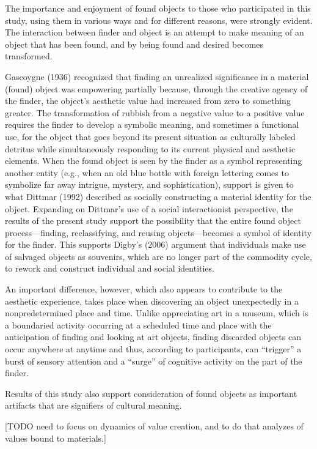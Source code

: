 The importance and enjoyment of found objects to those who participated in this study, using them in various ways and for different reasons, were strongly evident. The interaction between finder and object is an attempt to make meaning of an object that has been found, and by being found and desired becomes transformed.

Gascoygne (1936) recognized that finding an unrealized significance in a material (found) object was empowering partially because, through the creative agency of the finder, the object’s aesthetic value had increased from zero to something greater. The transformation of rubbish from a negative value to a positive value requires the finder to develop a symbolic meaning, and sometimes a functional use, for the object that goes beyond its present situation as culturally labeled detritus while simultaneously responding to its current physical and aesthetic elements. When the found object is seen by the finder as a symbol representing another entity (e.g., when an old blue bottle with foreign lettering comes to symbolize far away intrigue, mystery, and sophistication), support is given to what Dittmar (1992) described as socially constructing a material identity for the object. Expanding on Dittmar’s use of a social interactionist perspective, the results of the present study support the possibility that the entire found object process---finding, reclassifying, and reusing objects---becomes a symbol of identity for the finder. This supports Digby’s (2006) argument that individuals make use of salvaged objects as souvenirs, which are no longer part of the commodity cycle, to rework and construct individual and social identities.

An important difference, however, which also appears to contribute to the aesthetic experience, takes place when discovering an object unexpectedly in a nonpredetermined place and time. Unlike appreciating art in a museum, which is a boundaried activity occurring at a scheduled time and place with the anticipation of finding and looking at art objects, finding discarded objects can occur anywhere at anytime and thus, according to participants, can “trigger” a burst of sensory attention and a “surge” of cognitive activity on the part of the finder. 

Results of this study also support consideration of found objects as important artifacts that are signifiers of cultural meaning.

[TODO need to focus on dynamics of value creation, and to do that analyzes of values bound to materials.]

